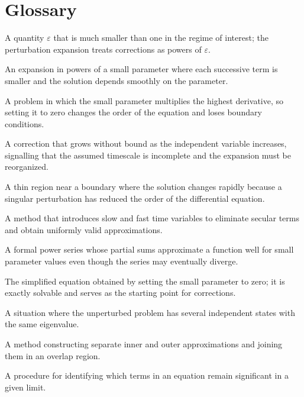 \section*{Glossary}
\begin{description}[leftmargin=*,style=nextline,itemsep=0.3em]
\item[\textbf{Small parameter.}] A quantity $\varepsilon$ that is much smaller than one in the regime of interest; the perturbation expansion treats corrections as powers of $\varepsilon$.
\item[\textbf{Regular perturbation.}] An expansion in powers of a small parameter where each successive term is smaller and the solution depends smoothly on the parameter.
\item[\textbf{Singular perturbation.}] A problem in which the small parameter multiplies the highest derivative, so setting it to zero changes the order of the equation and loses boundary conditions.
\item[\textbf{Secular term.}] A correction that grows without bound as the independent variable increases, signalling that the assumed timescale is incomplete and the expansion must be reorganized.
\item[\textbf{Boundary layer.}] A thin region near a boundary where the solution changes rapidly because a singular perturbation has reduced the order of the differential equation.
\item[\textbf{Multiple scales.}] A method that introduces slow and fast time variables to eliminate secular terms and obtain uniformly valid approximations.
\item[\textbf{Asymptotic series.}] A formal power series whose partial sums approximate a function well for small parameter values even though the series may eventually diverge.
\item[\textbf{Unperturbed problem.}] The simplified equation obtained by setting the small parameter to zero; it is exactly solvable and serves as the starting point for corrections.
\item[\textbf{Degeneracy.}] A situation where the unperturbed problem has several independent states with the same eigenvalue.
\item[\textbf{Matched asymptotic expansions.}] A method constructing separate inner and outer approximations and joining them in an overlap region.
\item[\textbf{Dominant balance.}] A procedure for identifying which terms in an equation remain significant in a given limit.
\end{description}
